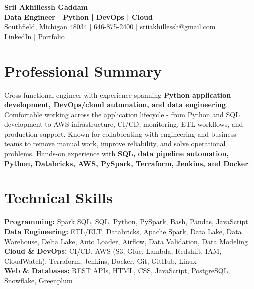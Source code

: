 \documentclass[letterpaper,10pt]{article}
\begin{document}
\fontsize{9.35pt}{10.45pt}\selectfont

\begin{center}
    {\LARGE \textbf{Srii Akhillessh Gaddam}} \\[-1pt]
    \textbf{Data Engineer | Python | DevOps | Cloud} \\[2pt]
    Southfield, Michigan 48034 $|$
    \href{tel:6468752400}{646-875-2400} $|$
    \href{mailto:sriiakhillessh@gmail.com}{sriiakhillessh@gmail.com} \\[1pt]
    \href{https://www.linkedin.com/in/srii-akhiilessh-gaddam-b48668191/}{LinkedIn} $|$
    \href{https://sriiakhillesshg.github.io/portfolio/}{Portfolio}
\end{center}
\vspace{-8pt}

\section{Professional Summary}
\small{Cross-functional engineer with experience spanning \textbf{Python application development, DevOps/cloud automation, and data engineering}. Comfortable working across the application lifecycle - from Python and SQL development to AWS infrastructure, CI/CD, monitoring, ETL workflows, and production support. Known for collaborating with engineering and business teams to remove manual work, improve reliability, and solve operational problems. Hands-on experience with \textbf{SQL, data pipeline automation, Python, Databricks, AWS, PySpark, Terraform, Jenkins, and Docker}.}

\section{Technical Skills}
\small{
\textbf{Programming:} Spark SQL, SQL, Python, PySpark, Bash, Pandas, JavaScript \\
\textbf{Data Engineering:} ETL/ELT, Databricks, Apache Spark, Data Lake, Data Warehouse, Delta Lake, Auto Loader, Airflow, Data Validation, Data Modeling \\
\textbf{Cloud \& DevOps:} CI/CD, AWS (S3, Glue, Lambda, Redshift, IAM, CloudWatch), Terraform, Jenkins, Docker, Git, GitHub, Linux \\
\textbf{Web \& Databases:} REST APIs, HTML, CSS, JavaScript, PostgreSQL, Snowflake, Greenplum
}
\end{document}
